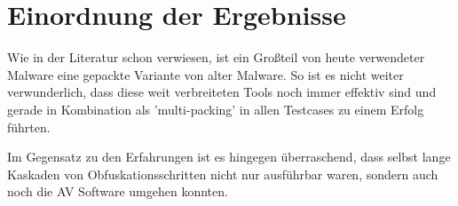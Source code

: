 \section{Einordnung der Ergebnisse}
Wie in der Literatur schon verwiesen, ist ein Großteil von heute verwendeter Malware eine gepackte Variante von alter Malware\cite{zhang_2019_a}. So ist es nicht weiter verwunderlich, dass diese weit verbreiteten Tools noch immer effektiv sind und gerade in Kombination als 'multi-packing' in allen Testcases zu einem Erfolg führten. 

Im Gegensatz zu den Erfahrungen ist es hingegen überraschend, dass selbst lange Kaskaden von Obfuskationsschritten nicht nur ausführbar waren, sondern auch noch die AV Software umgehen konnten. 